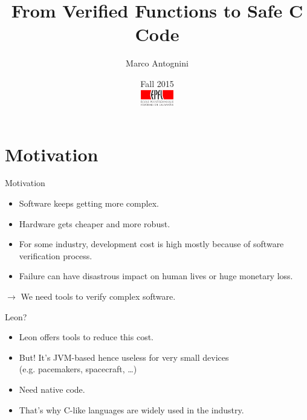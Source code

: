 \documentclass[10pt, compress, xcolor={usenames,dvipsnames}]{beamer}
\title{From Verified Functions to Safe C Code}
\author{Marco Antognini}
\date{%
  \small Fall 2015\\[2em]
  \includegraphics[height=7mm]{img/epfl-logo}}
\newcommand{\SmallArrow}{\ding{228}}
\newcommand{\BigArrow}{$\longrightarrow$\xspace}
\renewcommand{\emph}[1]{\alert{#1}}
\newcommand{\light}{\color{TealBlue}}
\begin{document}
\begin{frame}
  \titlepage
\end{frame}


\section{Motivation}

\begin{frame}[fragile]{Motivation}

  \begin{itemize}[label=\SmallArrow]

    \item Software keeps getting more complex.
    \item Hardware gets cheaper and more robust.
    \item For some industry, development cost is high mostly because of
      software verification process.
    \item Failure can have disastrous impact on human lives or huge monetary
      loss.

  \end{itemize}

  \vspace{1em}

  \BigArrow We need tools to \emph{verify complex software}.

\end{frame}

\begin{frame}[fragile]{Leon?}

  \begin{itemize}[label=\SmallArrow]

    \item Leon offers tools to reduce this cost.
    \item \emph{But!} It's JVM-based hence useless for \emph{very small
      devices} \\
      (e.g. pacemakers, spacecraft, \ldots)
    \item Need {\light native} code.
    \item That's why C-like languages are widely used in the industry.

  \end{itemize}

\end{frame}
\end{document}
